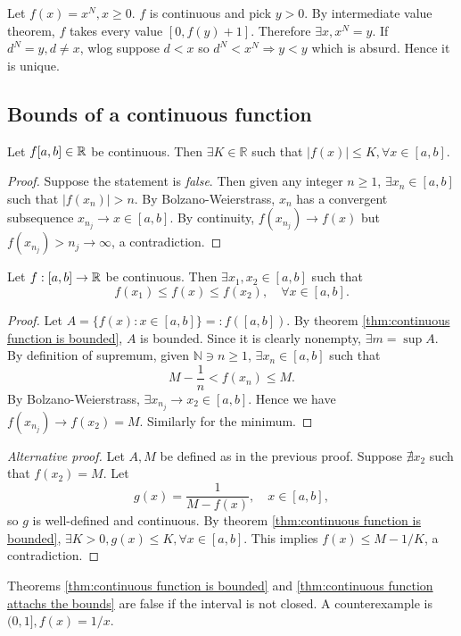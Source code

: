 \begin{example}
    Let $ f(x)=x^N, x\ge 0 $. $f$ is continuous and pick $y>0$. By intermediate value theorem, $f$ takes every value $ [0,f(y)+1] $. Therefore $ \exists x, x^N=y $. If $ d^N=y,d\neq x $, wlog suppose $d<x$ so $ d^N<x^N \Rightarrow y<y $ which is absurd. Hence it is unique. 
\end{example}

\subsection{Bounds of a continuous function}
\begin{theorem}\label{thm:continuous function is bounded}
    Let $f[a,b]\in {\mathbb{R}}$ be continuous. Then $ \exists K\in \mathbb{R}  $ such that $ |f(x)|\le K, \forall x\in [a,b] $.
\end{theorem}
\begin{proof}
    Suppose the statement is \textit{false}. Then given any integer $ n\ge 1 $, $ \exists x_n\in[a,b] $ such that $ |f(x_n)|> n $. By Bolzano-Weierstrass, $x_n$ has a convergent subsequence $ x_{n_j}\to x\in [a,b] $. By continuity, $ f(x_{n_j})\to f(x) $ but $f(x_{n_j})>n_j\to \infty$, a contradiction.
\end{proof}

\begin{theorem}\label{thm:continuous function attachs the bounds}
    Let $ f:[a,b]\to {\mathbb{R}} $ be continuous. Then $ \exists x_1,x_2\in [a,b] $ such that 
    \[
        f(x_1)\le f(x)\le f(x_2),\quad \forall x\in [a,b].
    \]
\end{theorem}
\begin{proof}
    Let $ A = \{f(x):x\in [a,b]\}=: f([a,b]) $. By theorem \ref{thm:continuous function is bounded}, $A$ is bounded. Since it is clearly nonempty, $ \exists m = \sup A $. By definition of supremum, given $ \mathbb{N} \ni n\ge 1$, $ \exists x_n\in [a,b] $ such that 
    \[
        M-\frac{1}{n}<f(x_n)\le M.
    \]
    By Bolzano-Weierstrass, $ \exists x_{n_j}\to x_2\in [a,b] $. Hence we have $ f(x_{n_j})\to f(x_2) = M $. Similarly for the minimum.
\end{proof}

\begin{proof}[Alternative proof]
    Let $A,M$ be defined as in the previous proof. Suppose $\nexists x_2$ such that $ f(x_2)=M $. Let 
    \[
        g(x) = \frac{1}{M-f(x)},\quad x\in [a,b],
    \]
    so $g$ is well-defined and continuous. By theorem \ref{thm:continuous function is bounded}, $ \exists K>0, g(x)\le K,\forall x\in [a,b] $. This implies $ f(x)\le M-1/K $, a contradiction.
\end{proof}
\begin{note}
    Theorems \ref{thm:continuous function is bounded} and \ref{thm:continuous function attachs the bounds} are false if the interval is not closed. A counterexample is $ (0,1], f(x)=1/x $.
\end{note}


